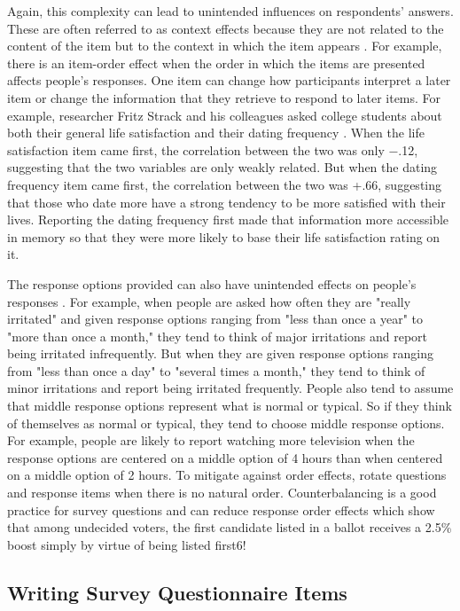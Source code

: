 Again, this complexity can lead to unintended influences on respondents’ answers. These are often referred to as context effects because they are not related to the content of the item but to the context in which the item appears \citep{schwarz_context_1991}. For example, there is an item-order effect when the order in which the items are presented affects people’s responses. One item can change how participants interpret a later item or change the information that they retrieve to respond to later items. For example, researcher Fritz Strack and his colleagues asked college students about both their general life satisfaction and their dating frequency \citep{strack_priming_1988}. When the life satisfaction item came first, the correlation between the two was only −.12, suggesting that the two variables are only weakly related. But when the dating frequency item came first, the correlation between the two was +.66, suggesting that those who date more have a strong tendency to be more satisfied with their lives. Reporting the dating frequency first made that information more accessible in memory so that they were more likely to base their life satisfaction rating on it.

The response options provided can also have unintended effects on people’s responses \citep{schwarz_self-reports:_1999}. For example, when people are asked how often they are "really irritated" and given response options ranging from "less than once a year" to "more than once a month," they tend to think of major irritations and report being irritated infrequently. But when they are given response options ranging from "less than once a day" to "several times a month," they tend to think of minor irritations and report being irritated frequently. People also tend to assume that middle response options represent what is normal or typical. So if they think of themselves as normal or typical, they tend to choose middle response options. For example, people are likely to report watching more television when the response options are centered on a middle option of 4 hours than when centered on a middle option of 2 hours. To mitigate against order effects, rotate questions and response items when there is no natural order. Counterbalancing is a good practice for survey questions and can reduce response order effects which show that among undecided voters, the first candidate listed in a ballot receives a 2.5\% boost simply by virtue of being listed first6!

\subsection{Writing Survey Questionnaire Items}

